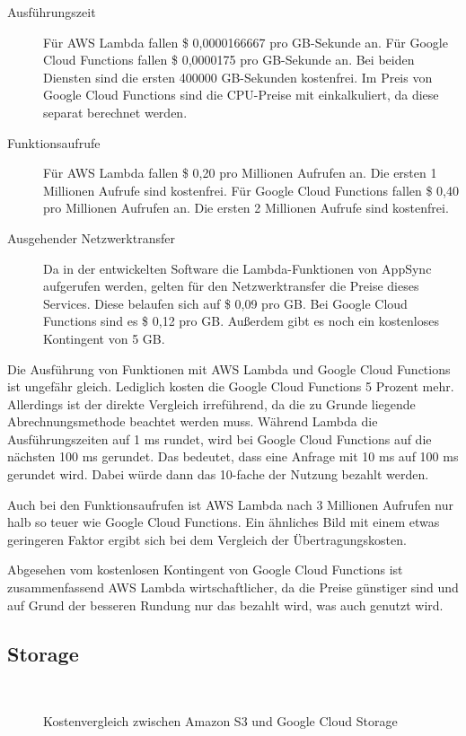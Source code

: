 \begin{description}
  \item[Ausführungszeit] Für AWS Lambda fallen \$ 0,0000166667 pro GB-Sekunde an. Für Google Cloud Functions fallen \$ 0,0000175 pro GB-Sekunde an. Bei beiden Diensten sind die ersten 400000 GB-Sekunden kostenfrei. Im Preis von Google Cloud Functions sind die CPU-Preise mit einkalkuliert, da diese separat berechnet werden.
  \item[Funktionsaufrufe] Für AWS Lambda fallen \$ 0,20 pro Millionen Aufrufen an. Die ersten 1 Millionen Aufrufe sind kostenfrei. Für Google Cloud Functions fallen \$ 0,40 pro Millionen Aufrufen an. Die ersten 2 Millionen Aufrufe sind kostenfrei.
  \item[Ausgehender Netzwerktransfer] Da in der entwickelten Software die Lambda-Funktionen von AppSync aufgerufen werden, gelten für den Netzwerktransfer die Preise dieses Services. Diese belaufen sich auf \$ 0,09 pro GB. Bei Google Cloud Functions sind es \$ 0,12 pro GB. Außerdem gibt es noch ein kostenloses Kontingent von 5 GB.
\end{description}

Die Ausführung von Funktionen mit \ac{AWS} Lambda und Google Cloud Functions ist ungefähr gleich. Lediglich kosten die Google Cloud Functions 5 Prozent mehr. Allerdings ist der direkte Vergleich irreführend, da die zu Grunde liegende Abrechnungsmethode beachtet werden muss. Während Lambda die Ausführungszeiten auf 1 ms rundet, wird bei Google Cloud Functions auf die nächsten 100 ms gerundet. Das bedeutet, dass eine Anfrage mit 10 ms auf 100 ms gerundet wird. Dabei würde dann das 10-fache der Nutzung bezahlt werden.

Auch bei den Funktionsaufrufen ist \ac{AWS} Lambda nach 3 Millionen Aufrufen nur halb so teuer wie Google Cloud Functions. Ein ähnliches Bild mit einem etwas geringeren Faktor ergibt sich bei dem Vergleich der Übertragungskosten.

Abgesehen vom kostenlosen Kontingent von Google Cloud Functions ist zusammenfassend \ac{AWS} Lambda wirtschaftlicher, da die Preise günstiger sind und auf Grund der besseren Rundung nur das bezahlt wird, was auch genutzt wird.

\subsection{Storage}

\begin{figure}
  \centering
  \quad
  \\
  \quad
  \caption{Kostenvergleich zwischen Amazon S3 und Google Cloud Storage}
  \label{kostenvergleichStorage}
\end{figure}

